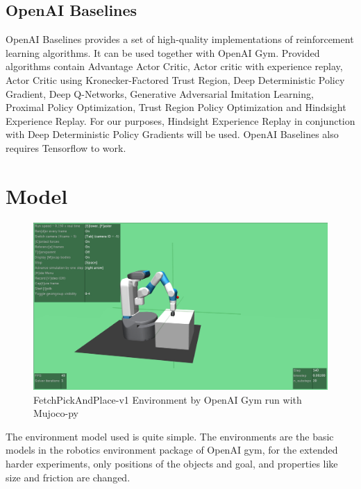 \subsection{OpenAI Baselines}

OpenAI Baselines provides a set of high-quality implementations of reinforcement learning algorithms. It can be used together with OpenAI Gym. Provided algorithms contain Advantage Actor Critic, Actor critic with experience replay, Actor Critic using Kronecker-Factored Trust Region,  Deep Deterministic Policy Gradient, Deep Q-Networks, Generative Adversarial Imitation Learning, Proximal Policy Optimization, Trust Region Policy Optimization and Hindsight Experience Replay.
For our purposes, Hindsight Experience Replay in conjunction with Deep Deterministic Policy Gradients will be used. 
OpenAI Baselines also requires Tensorflow to work.

\section{Model}

\begin{figure} [h]
	
	\centering
	\includegraphics[width=1\textwidth]{figures/FetchPickAndPlace-v1.png}
	\caption{FetchPickAndPlace-v1 Environment by OpenAI Gym run with Mujoco-py
	}
\end{figure}

The environment model used is quite simple. The environments are the basic models in the robotics environment package of OpenAI gym, for the extended harder experiments, only positions of the objects and goal, and properties like size and friction are changed. 

